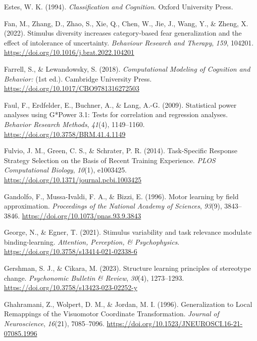 \documentclass[
  11pt,
  letterpaper,
]{article}
\newlength{\cslhangindent}
\newenvironment{CSLReferences}[2] %
 {\begin{list}{}{%
  \setlength{\itemindent}{0pt}
  \setlength{\leftmargin}{0pt}
  \setlength{\parsep}{0pt}
  \ifodd #1
   \setlength{\leftmargin}{\cslhangindent}
   \setlength{\itemindent}{-1\cslhangindent}
  \fi
  \setlength{\itemsep}{#2\baselineskip}}}
 {\end{list}}
\begin{document}
\begin{CSLReferences}{1}{0}
Estes, W. K. (1994). \emph{Classification and {Cognition}}. Oxford
University Press.

Fan, M., Zhang, D., Zhao, S., Xie, Q., Chen, W., Jie, J., Wang, Y., \&
Zheng, X. (2022). Stimulus diversity increases category-based fear
generalization and the effect of intolerance of uncertainty.
\emph{Behaviour Research and Therapy}, \emph{159}, 104201.
\url{https://doi.org/10.1016/j.brat.2022.104201}

Farrell, S., \& Lewandowsky, S. (2018). \emph{Computational {Modeling}
of {Cognition} and {Behavior}:} (1st ed.). Cambridge University Press.
\url{https://doi.org/10.1017/CBO9781316272503}

Faul, F., Erdfelder, E., Buchner, A., \& Lang, A.-G. (2009). Statistical
power analyses using {G}*{Power} 3.1: {Tests} for correlation and
regression analyses. \emph{Behavior Research Methods}, \emph{41}(4),
1149--1160. \url{https://doi.org/10.3758/BRM.41.4.1149}

Fulvio, J. M., Green, C. S., \& Schrater, P. R. (2014). Task-{Specific
Response Strategy Selection} on the {Basis} of {Recent Training
Experience}. \emph{PLOS Computational Biology}, \emph{10}(1), e1003425.
\url{https://doi.org/10.1371/journal.pcbi.1003425}

Gandolfo, F., Mussa-Ivaldi, F. A., \& Bizzi, E. (1996). Motor learning
by field approximation. \emph{Proceedings of the National Academy of
Sciences}, \emph{93}(9), 3843--3846.
\url{https://doi.org/10.1073/pnas.93.9.3843}

George, N., \& Egner, T. (2021). Stimulus variability and task relevance
modulate binding-learning. \emph{Attention, Perception, \&
Psychophysics}. \url{https://doi.org/10.3758/s13414-021-02338-6}

Gershman, S. J., \& Cikara, M. (2023). Structure learning principles of
stereotype change. \emph{Psychonomic Bulletin \& Review}, \emph{30}(4),
1273--1293. \url{https://doi.org/10.3758/s13423-023-02252-y}

Ghahramani, Z., Wolpert, D. M., \& Jordan, M. I. (1996). Generalization
to {Local Remappings} of the {Visuomotor Coordinate Transformation}.
\emph{Journal of Neuroscience}, \emph{16}(21), 7085--7096.
\url{https://doi.org/10.1523/JNEUROSCI.16-21-07085.1996}


\end{CSLReferences}
\end{document}
